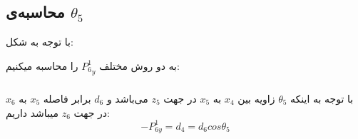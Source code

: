 \documentclass{article}
\begin{document}
\subsection{محاسبه‌ی $\theta_5$}
با توجه به شکل:
\begin{figure}[H]%
	\centering
    \caption{\label{fig:formula25}}
\end{figure}
\noindent
به دو روش مختلف ${P_6^1}_y$ را محاسبه میکنیم:

\subsubsection{}
با توجه به اینکه $\theta_5$ زاویه بین $x_4$ به $x_5$ در جهت $z_5$ می‌باشد و $d_6$ برابر فاصله $x_5$  به $x_6$ در جهت $z_6$ میباشد داریم:
\begin{equation}
-P_{6y}^1 = d_4 = d_{6}cos \theta_5
\end{equation}
\end{document}
